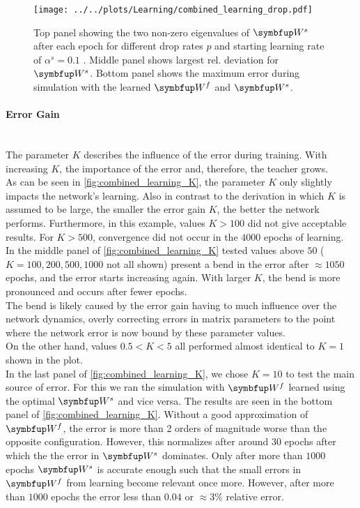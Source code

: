 \begin{figure}
	\centering
	\texttt{[image: ../../plots/Learning/combined\_learning\_drop.pdf]}
	\caption{Top panel showing the two non-zero eigenvalues  of $\bmu{W}^s$ after each epoch for different drop rates $p$ and starting learning rate of $\alpha^s = 0.1$ . Middle panel shows largest rel. deviation for $\bmu{W}^s$. Bottom panel shows the maximum error during simulation with the learned $\bmu{W}^f$ and $\bmu{W}^s$.}
\label{fig:combined_learning_dr}
\end{figure}


\paragraph{Error Gain}\mbox{}\\
The parameter $K$ describes the influence of the error during training. With increasing $K$, the importance of the error and, therefore, the teacher grows.\\
As can be seen in \cref{fig:combined_learning_K}, the parameter $K$ only slightly impacts the network's learning. Also in contrast to the derivation in which $K$ is assumed to be large, the smaller the error gain $K$, the better the network performs. Furthermore, in this example, values $K>100$ did not give acceptable results. For $K>500$, convergence did not occur in the $4000$ epochs of learning.\\
In the middle panel of \cref{fig:combined_learning_K} tested values above $50$ ($K = 100, 200,500,1000$ not all shown) present a bend in the error after $\approx 1050$ epochs, and the error starts increasing again. With larger $K$, the bend is more pronounced and occurs after fewer epochs.\\
The bend is likely caused by the error gain having to much influence over the network dynamics, overly correcting errors in matrix parameters to the point where the network error is now bound by these parameter values.\\
On the other hand, values $0.5<K<5$ all performed almost identical to $K=1$ shown in the plot.\\
In the last panel of \cref{fig:combined_learning_K}, we chose $K=10$ to test the main source of error. For this we ran the simulation with $\bmu{W}^f$ learned using the optimal $\bmu{W}^s$ and vice versa. The results are seen in the bottom panel of \cref{fig:combined_learning_K}. Without a good approximation of $\bmu{W}^f$, the error is more than 2 orders of magnitude worse than the opposite configuration. However, this normalizes after around $30$ epochs after which the the error in $\bmu{W}^s$ dominates. Only after more than $1000$ epochs $\bmu{W}^s$ is accurate enough such that the small errors in $\bmu{W}^f$ from learning become relevant once more. However, after more than $1000$ epochs the error less than $0.04$ or $\approx 3\%$ relative error.\\
